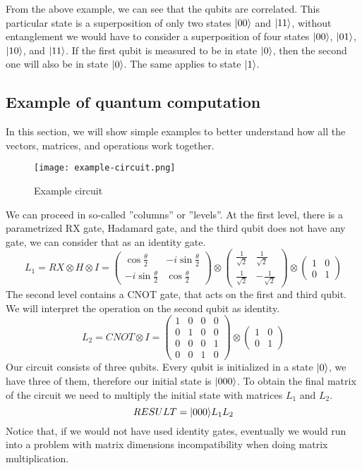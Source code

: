 \noindent From the above example, we can see that the qubits are correlated. This particular state is a superposition of only two states $\lvert00\rangle$ and $\lvert11\rangle$, without entanglement we would have to consider a superposition of four states $\lvert00\rangle$, $\lvert01\rangle$, $\lvert10\rangle$, and $\lvert11\rangle$. If the first qubit is measured to be in state $\lvert0\rangle$, then the second one will also be in state $\lvert0\rangle$. The same applies to state $\lvert1\rangle$.

\subsection{Example of quantum computation}
In this section, we will show simple examples to better understand how all the vectors, matrices, and operations work together.

\begin{figure}[H]
    \begin{center}
       \texttt{[image: example-circuit.png]}
       \caption{Example circuit}
    \end{center}
\end{figure}

We can proceed in so-called ''columns'' or ''levels''.
At the first level, there is a parametrized RX gate, Hadamard gate, and the third qubit does not have any gate, we can consider that as an identity gate.
$$L_1 = RX \otimes H \otimes I = \begin{pmatrix} 
\cos{\frac{\theta}{2}} & -i\sin{\frac{\theta}{2}} \\
-i\sin{\frac{\theta}{2}} & \cos{\frac{\theta}{2}}
\end{pmatrix} \otimes \begin{pmatrix} 
\frac{1}{\sqrt{2}} &  \frac{1}{\sqrt{2}}  \\
\frac{1}{\sqrt{2}}  &  -\frac{1}{\sqrt{2}} 
\end{pmatrix} \otimes \begin{pmatrix} 
1 & 0 \\
0 & 1
\end{pmatrix}$$
The second level contains a CNOT gate, that acts on the first and third qubit. We will interpret the operation on the second qubit as identity. 
$$ L_2 = CNOT \otimes I = \begin{pmatrix}
1 & 0 & 0 & 0 \\
0 & 1 & 0 & 0 \\
0 & 0 & 0 & 1 \\
0 & 0 & 1 & 0
\end{pmatrix}\otimes\begin{pmatrix} 
1 & 0 \\
0 & 1
\end{pmatrix}$$
Our circuit consists of three qubits. Every qubit is initialized in a state $\lvert0\rangle$, we have three of them, therefore our initial state is $\lvert000\rangle$. To obtain the final matrix of the circuit we need to multiply the initial state with matrices $L_1$ and $L_2$.
$$RESULT = \lvert000\rangle L_{1}L_2$$
Notice that, if we would not have used identity gates, eventually we would run into a problem with matrix dimensions incompatibility when doing matrix multiplication.

